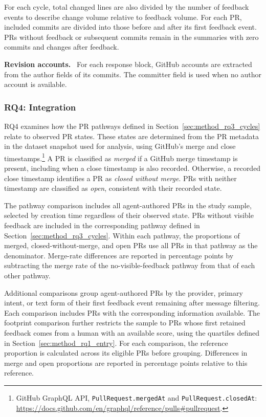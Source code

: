\documentclass[10pt,conference,anonymous]{IEEEtran}
\newcommand{\runinhead}[1]{\noindent\textbf{#1.}\ }
\begin{document}
For each cycle, total changed lines are also divided by the number of feedback events to describe change volume relative to feedback volume.
For each PR, included commits are divided into those before and after its first feedback event.
PRs without feedback or subsequent commits remain in the summaries with zero commits and changes after feedback.

\runinhead{Revision accounts}
For each response block, GitHub accounts are extracted from the author fields of its commits.
The committer field is used when no author account is available.

\subsubsection{RQ4: Integration}
\label{sec:method_taxonomy_rq4}

RQ4 examines how the PR pathways defined in Section~\ref{sec:method_rq3_cycles} relate to observed PR states.
These states are determined from the PR metadata in the dataset snapshot used for analysis, using GitHub's merge and close timestamps.\footnote{GitHub GraphQL API, \texttt{PullRequest.mergedAt} and \texttt{PullRequest.closedAt}: \url{https://docs.github.com/en/graphql/reference/pulls\#pullrequest}.}
A PR is classified as \emph{merged} if a GitHub merge timestamp is present, including when a close timestamp is also recorded.
Otherwise, a recorded close timestamp identifies a PR as \emph{closed without merge}.
PRs with neither timestamp are classified as \emph{open}, consistent with their recorded state.

The pathway comparison includes all agent-authored PRs in the study sample, selected by creation time regardless of their observed state.
PRs without visible feedback are included in the corresponding pathway defined in Section~\ref{sec:method_rq3_cycles}.
Within each pathway, the proportions of merged, closed-without-merge, and open PRs use all PRs in that pathway as the denominator.
Merge-rate differences are reported in percentage points by subtracting the merge rate of the no-visible-feedback pathway from that of each other pathway.

Additional comparisons group agent-authored PRs by the provider, primary intent, or text form of their first feedback event remaining after message filtering.
Each comparison includes PRs with the corresponding information available.
The footprint comparison further restricts the sample to PRs whose first retained feedback comes from a human with an available score, using the quartiles defined in Section~\ref{sec:method_rq1_entry}.
For each comparison, the reference proportion is calculated across its eligible PRs before grouping.
Differences in merge and open proportions are reported in percentage points relative to this reference.
\end{document}
